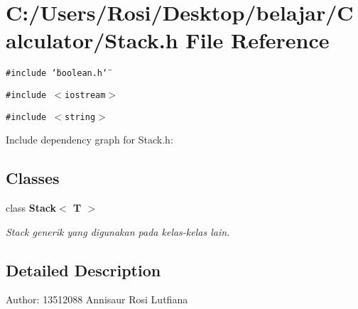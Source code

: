 \section{C:/Users/Rosi/Desktop/belajar/Calculator/Stack.h File Reference}
\label{_stack_8h}
{\tt \#include \char`\"{}boolean.h\char`\"{}}\par
{\tt \#include $<$iostream$>$}\par
{\tt \#include $<$string$>$}\par


Include dependency graph for Stack.h:\subsection*{Classes}
\begin{CompactItemize}
\item 
class {\bf Stack$<$ T $>$}
\begin{CompactList}\small\item\em Stack generik yang digunakan pada kelas-kelas lain. \item\end{CompactList}\end{CompactItemize}


\subsection{Detailed Description}
\begin{Desc}
\item[Author:]13512088 Annisaur Rosi Lutfiana \end{Desc}
